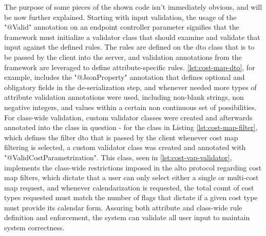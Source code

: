     The purpose of some pieces of the shown code isn't immediately obvious, and will be now further explained.
    Starting with input validation, the usage of the "@Valid" annotation on an endpoint controller parameter signifies that the framework must initialize a validator class that should examine and validate that input against the defined rules.
    The rules are defined on the \gls{dto} class that is to be passed by the client into the server, and validation annotations from the framework are leveraged to define attribute-specific rules.
    \ref{lst:cost-map-dto}, for example, includes the "@JsonProperty" annotation that defines optional and obligatory fields in the de-serialization step, and whenever needed more types of attribute validation annotations were used, including non-blank strings, non negative integers, and values within a certain non continuous set of possibilities.
    For class-wide validation, custom validator classes were created and afterwards annotated into the class in question - for the class in Listing \ref{lst:cost-map-filter}, which defines the filter \gls{dto} that is passed by the client whenever cost map filtering is selected, a custom validator class was created and annotated with "@ValidCostParametrization".
    This class, seen in \ref{lst:cost-vap-validator}, implements the class-wide restrictions imposed in the \gls{alto} protocol regarding cost map filters, which dictate that a user can only select either a single or multi-cost map request, and whenever calendarization is requested, the total count of cost types requested must match the number of flags that dictate if a given cost type must provide its calendar form.
    Assuring both attribute and class-wide rule definition and enforcement, the system can validate all user input to maintain system correctness.

